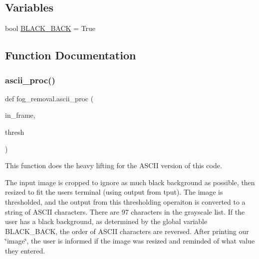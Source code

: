 \subsection*{Variables}
\begin{DoxyCompactItemize}
\item 
bool \hyperlink{namespacefog__removal_ad88aa1ec890d366b2f2c71131bc1f657}{B\+L\+A\+C\+K\+\_\+\+B\+A\+CK} = True
\end{DoxyCompactItemize}


\subsection{Function Documentation}
\mbox{\label{namespacefog__removal_a50fdb2a1e3f55a7f77230a689a372876}} 
\subsubsection{\texorpdfstring{ascii\+\_\+proc()}{ascii\_proc()}}
{\footnotesize\ttfamily def fog\+\_\+removal.\+ascii\+\_\+proc (\begin{DoxyParamCaption}\item[{}]{in\+\_\+frame,  }\item[{}]{thresh }\end{DoxyParamCaption})}



This function does the heavy lifting for the A\+S\+C\+II version of this code. 

The input image is cropped to ignore as much black background as possible, then resized to fit the user\textquotesingle{}s terminal (using output from {\ttfamily tput}). The image is thresholded, and the output from this thresholding operaiton is converted to a string of A\+S\+C\+II characters. There are 97 characters in the grayscale list. If the user has a black background, as determined by the global variable B\+L\+A\+C\+K\+\_\+\+B\+A\+CK, the order of A\+S\+C\+II characters are reversed. After printing our \char`\"{}image\char`\"{}, the user is informed if the image was resized and reminded of what value they entered.


